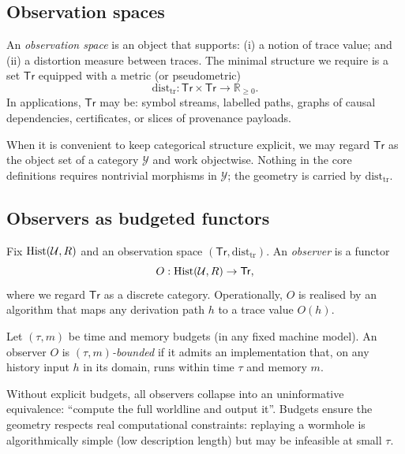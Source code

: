 \documentclass{aion}
\newcommand{\Tr}{\mathsf{Tr}}
\begin{document}
\subsection{Observation spaces}
\label{subsec:obs-spaces}

An \emph{observation space} is an object that supports:
(i) a notion of trace value; and (ii) a distortion measure between traces.
The minimal structure we require is a set $\Tr$ equipped with a metric (or pseudometric)
\[
  \mathrm{dist}_{\mathrm{tr}} : \Tr\times\Tr\to\mathbb{R}_{\ge 0}.
\]
In applications, $\Tr$ may be:
symbol streams, labelled paths, graphs of causal dependencies, certificates, or slices of provenance payloads.

When it is convenient to keep categorical structure explicit, we may regard $\Tr$ as the object set of a category $\mathcal{Y}$
and work objectwise. Nothing in the core definitions requires nontrivial morphisms in $\mathcal{Y}$; the geometry is carried
by $\mathrm{dist}_{\mathrm{tr}}$.

\subsection{Observers as budgeted functors}
\label{subsec:obs-functors}

\begin{definition}[Observer]\label{def:observer}
Fix $\operatorname{Hist}(\mathcal{U},R)$ and an observation space $(\Tr,\mathrm{dist}_{\mathrm{tr}})$.
An \emph{observer} is a functor
\[
  O : \Hist(\mathcal{U},R)\to \Tr,
\]
where we regard $\Tr$ as a discrete category.
Operationally, $O$ is realised by an algorithm that maps any derivation path $h$ to a trace value $O(h)$.
\end{definition}

\begin{definition}\label{def:budgeted-observer}
Let $(\tau,m)$ be time and memory budgets (in any fixed machine model).
An observer $O$ is \emph{$(\tau,m)$-bounded} if it admits an implementation that, on any history input $h$ in its domain,
runs within time $\tau$ and memory $m$.
\end{definition}

\begin{remark}
Without explicit budgets, all observers collapse into an uninformative equivalence: ``compute the full worldline and output it''.
Budgets ensure the geometry respects real computational constraints: replaying a wormhole is algorithmically simple
(low description length) but may be infeasible at small $\tau$.
\end{remark}
\end{document}
